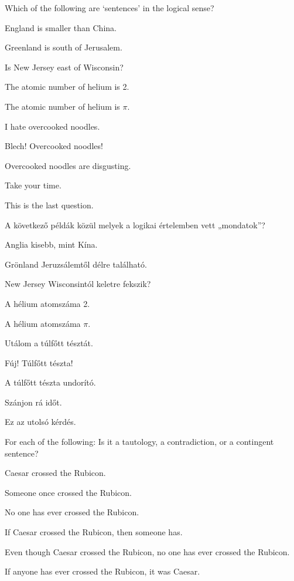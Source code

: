 \problempart
Which of the following are `sentences' in the logical sense?
\begin{earg}
\item England is smaller than China.
\item Greenland is south of Jerusalem.
\item Is New Jersey east of Wisconsin?
\item The atomic number of helium is 2.
\item The atomic number of helium is $\pi$.
\item I hate overcooked noodles.
\item Blech! Overcooked noodles!
\item Overcooked noodles are disgusting.
\item Take your time.
\item This is the last question.
\end{earg}

\problempart
A következő példák közül melyek a logikai értelemben vett „mondatok”?
\begin{earg}
\item Anglia kisebb, mint Kína.
\item Grönland Jeruzsálemtől délre található.
\item New Jersey Wisconsintól keletre fekszik?
\item A hélium atomszáma 2.
\item A hélium atomszáma $\pi$.
\item Utálom a túlfőtt tésztát.
\item Fúj! Túlfőtt tészta!
\item A túlfőtt tészta undorító.
\item Szánjon rá időt.
\item Ez az utolsó kérdés.
\end{earg}

\problempart
\label{pr.EnglishTautology}
For each of the following: Is it a tautology, a contradiction, or a contingent sentence?
\begin{earg}
\item Caesar crossed the Rubicon.
\item Someone once crossed the Rubicon.
\item No one has ever crossed the Rubicon.
\item If Caesar crossed the Rubicon, then someone has.
\item Even though Caesar crossed the Rubicon, no one has ever crossed the Rubicon.
\item If anyone has ever crossed the Rubicon, it was Caesar.
\end{earg}

